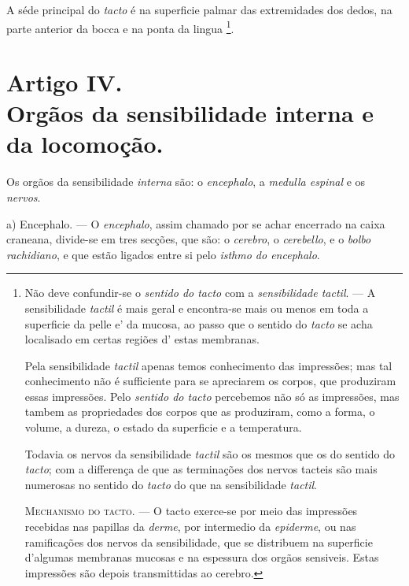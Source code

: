 A séde principal do \emph{tacto} é na superficie palmar das extremidades dos dedos, na parte anterior da bocca e na ponta da lingua \footnote{Não deve confundir-se o \emph{sentido do tacto} com a \emph{sensibilidade tactil}. --- A sensibilidade \emph{tactil} é mais geral e encontra-se mais ou menos em toda a superficie da pelle e' da mucosa, ao passo que o sentido do \emph{tacto} se acha localisado em certas regiões d' estas membranas.\par Pela sensibilidade \emph{tactil} apenas temos conhecimento das impressões; mas tal conhecimento não é sufficiente para se apreciarem os corpos, que produziram essas impressões. Pelo \emph{sentido do tacto} percebemos não só as impressões, mas tambem as propriedades dos corpos que as produziram, como a forma, o volume, a dureza, o estado da superficie e a temperatura.\par Todavia os nervos da sensibilidade \emph{tactil} são os mesmos que os do sentido do \emph{tacto}; com a differença de que as terminações dos nervos tacteis são mais numerosas no sentido do \emph{tacto} do que na sensibilidade \emph{tactil}.\par \textsc{Mechanismo do tacto}. --- O tacto exerce-se por meio das impressões recebidas nas papillas da \emph{derme}, por intermedio da \emph{epiderme}, ou nas ramificações dos nervos da sensibilidade, que se distribuem na superficie d'algumas membranas mucosas e na espessura dos orgãos sensiveis. Estas impressões são depois transmittidas ao cerebro.}.


\section*{Artigo IV.\\ Orgãos da sensibilidade interna e da locomoção.}


Os orgãos da sensibilidade \emph{interna} são: o \emph{encephalo}, a \emph{medulla espinal} e os \emph{nervos}.

a) Encephalo. --- O \emph{encephalo}, assim chamado por se achar encerrado na caixa craneana, divide-se em tres secções, que são: o \emph{cerebro}, o \emph{cerebello}, e o \emph{bolbo rachidiano}, e que estão ligados entre si pelo \emph{isthmo do encephalo}.

